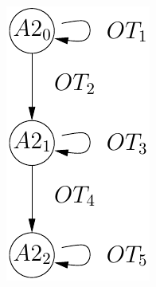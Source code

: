 \documentclass{lncs/llncs}
\begin{document}
\begin{figure}[t]
  \begin{minipage}{2cm}
  \includegraphics[width=\linewidth]{XFIG/PQR2-automaton}
  \end{minipage}
  \hspace{10mm}
  \begin{minipage}{7cm}

\end{minipage}
\end{figure}
\end{document}
